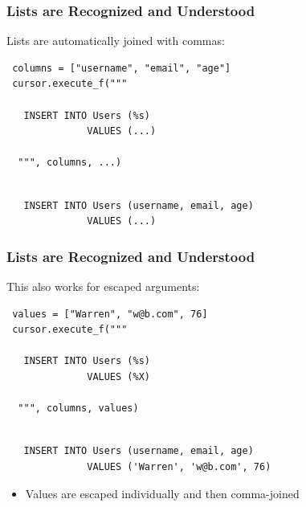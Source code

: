 \documentclass{beamer}
\begin{document}
\begin{frame}[fragile]
  \frametitle{Lists are Recognized and Understood}

  Lists are automatically joined with commas:
\begin{verbatim}
 columns = ["username", "email", "age"]
 cursor.execute_f("""

   INSERT INTO Users (%s) 
              VALUES (...)

  """, columns, ...)
\end{verbatim}

\begin{verbatim}

   INSERT INTO Users (username, email, age)
              VALUES (...)

\end{verbatim}

\end{frame}



\begin{frame}[fragile]
  \frametitle{Lists are Recognized and Understood}

  This also works for escaped arguments:
\begin{verbatim}
 values = ["Warren", "w@b.com", 76]
 cursor.execute_f("""

   INSERT INTO Users (%s) 
              VALUES (%X)

  """, columns, values)
\end{verbatim}

\begin{verbatim}

   INSERT INTO Users (username, email, age)
              VALUES ('Warren', 'w@b.com', 76)

\end{verbatim}

\begin{itemize}
\item Values are escaped individually and then comma-joined
\end{itemize}

\end{frame}
\end{document}
